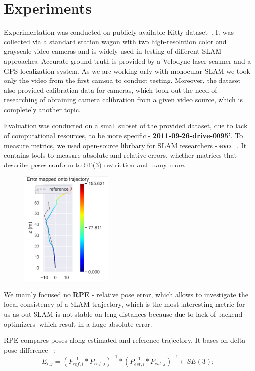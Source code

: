 \pagebreak
\section{Experiments}
Experimentation was conducted on publicly available Kitty dataset~\cite{Kitty}. It was collected via a standard station wagon with two high-resolution color and grayscale video cameras and is widely used in testing of different SLAM approaches. Accurate ground truth is provided by a Velodyne laser scanner and a GPS localization system. As we are working only with monocular SLAM we took only the video from the first camera to conduct testing. Moreover, the dataset also provided calibration data for cameras, which took out the need of researching of obraining camera calibration from a given video source, which is completely another topic.

Evaluation was conducted on a small subset of the provided dataset, due to lack of computational resources, to be more specific - {\bf 2011-09-26-drive-0095'}. 
To measure metrics, we used open-source librbary for SLAM researchers - {\bf evo} ~\cite{Evo}. It contains tools to measure absolute and relative errors, whether matrices that describe poses conform to SE(3) restriction and many more. 

\begin{figure}
    \centering
    \includegraphics[width=0.4\textwidth]{results/error_mapped.png}
\end{figure}

We mainly focused no {\bf RPE} - relative pose error, which allows to investigate the local consistency of a SLAM trajectory, which is the most interesting metric for us as out SLAM is not stable on long distances because due to lack of backend optimizers, which result in a huge absolute error.

RPE compares poses along estimated and reference trajectory. It bases on delta pose difference ~\cite{ErrorMeasurement}: 
\begin{equation}
E_{i, j} = (P^{-1}_{ref, i} * P_{ref, j})^{-1} * (P^{-1}_{est, i} * P_{est, j})^{-1} \in SE(3);
\end{equation}

